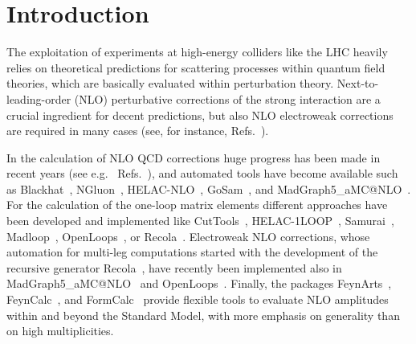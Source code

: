 \documentclass[preprint,sort&compress,12pt]{elsarticle}
\def\citeres#1{\mbox{Refs.~\cite{#1}}}
\def\eg{e.g.\ }
\begin{document}


\section{Introduction}
\label{se:intro}

The exploitation of experiments at high-energy colliders like the LHC
heavily relies on theoretical predictions for scattering processes
within quantum field theories, which are basically evaluated within
perturbation theory.  Next-to-leading-order (NLO) perturbative
corrections of the strong interaction are a crucial ingredient for
decent predictions, but also NLO electroweak corrections are required
in many cases
(see, for instance, \citeres{Campbell:2013qaa,Butterworth:2014efa}).

\begin{sloppypar}
In the calculation of NLO QCD corrections huge progress has been made
in recent years (see \eg 
\citeres{Campbell:2013qaa,Butterworth:2014efa,Bern:2008ef,Binoth:2010ra,AlcarazMaestre:2012vp}), and
automated tools have
become available such as 
{\sc Blackhat}~\cite{Berger:2008sj}, 
{\sc NGluon}~\cite{Badger:2010nx}, 
{\sc HELAC-NLO}~\cite{Bevilacqua:2011xh},
{\sc GoSam}~\cite{Cullen:2011ac}, and
{\sc MadGraph5\_aMC@NLO}~\cite{Alwall:2014hca}.
For the calculation of the one-loop
matrix elements different approaches have been developed and
implemented like 
{\sc CutTools}~\cite{Ossola:2007ax}, 
{\sc HELAC-1LOOP}~\cite{vanHameren:2009dr}, 
{\sc Samurai}~\cite{Mastrolia:2010nb}, 
{\sc Madloop}~\cite{Hirschi:2011pa}, 
{\sc OpenLoops}~\cite{Cascioli:2011va}, 
or {\sc Recola}~\cite{Actis:2012qn}.
Electroweak NLO corrections, 
whose automation for multi-leg computations started with the development of the recursive
generator 
{\sc Recola}~\cite{Actis:2012qn}, have recently been implemented also in
{\sc MadGraph5\_aMC@NLO}~\cite{Frixione:2014qaa,Frixione:2015zaa} and
{\sc OpenLoops}~\cite{Kallweit:2014xda,Kallweit:2015dum}. 
Finally, the packages {\sc
  FeynArts}~\cite{Hahn:2000kx},
{\sc  FeynCalc}~\cite{Mertig:1990an,Shtabovenko:2016sxi}, and 
{\sc FormCalc}~\cite{Hahn:1998yk,Agrawal:2012cv,Nejad:2013ina}
provide flexible tools to evaluate NLO amplitudes within and
beyond the Standard Model, with more emphasis on generality than on high multiplicities.
\end{sloppypar}
\end{document}
